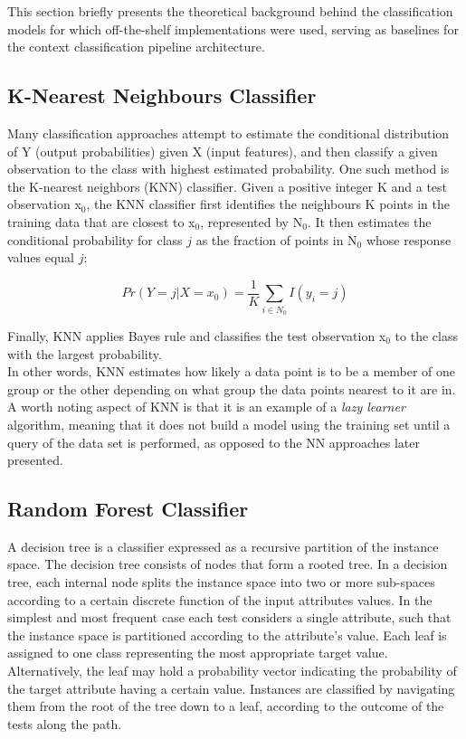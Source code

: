 This section briefly presents the theoretical background behind the classification models for which off-the-shelf implementations were used, serving as baselines for the context classification pipeline architecture. 

\subsection{K-Nearest Neighbours Classifier}
Many classification approaches attempt to estimate the conditional distribution of Y (output probabilities) given X (input features), and then classify a given observation to the class with highest estimated probability. One such method is the K-nearest neighbors (KNN) classifier. Given a positive integer K and a test observation x$_0$, the KNN classifier first identifies the neighbours K points in the training data that are closest to x$_0$, represented by N$_0$. It then estimates the conditional probability for class $j$ as the fraction of points in N$_0$ whose response values equal $j$:

\begin{equation}
    Pr(Y = j|X = x_0) = \frac{1}{K} \sum_{i \in N_0} I(y_i = j)
\end{equation}

Finally, KNN applies Bayes rule and classifies the test observation x$_0$ to
the class with the largest probability. \\

In other words, KNN estimates how likely a data point is to be a member of one group or the other depending on what group the data points nearest to it are in. A worth noting aspect of KNN is that it is an example of a \textit{lazy learner} algorithm, meaning that it does not build a model using the training set until a query of the data set is performed, as opposed to the NN approaches later presented. \\




\subsection{Random Forest Classifier}

A decision tree is a classifier expressed as a recursive partition of the instance space. The decision tree consists of nodes that form a rooted tree. In a decision tree, each internal node splits the instance space into two or more sub-spaces according to a certain discrete function of the input attributes values. In the simplest and most frequent case each test considers a single attribute, such that the instance space is partitioned according to the attribute’s value. Each leaf is assigned to one class representing the most appropriate target value. Alternatively, the leaf may hold a probability vector indicating the probability of the target attribute having a certain value. Instances are classified by navigating them from the root of the tree down to a leaf, according to the outcome of the tests along the path. \\

